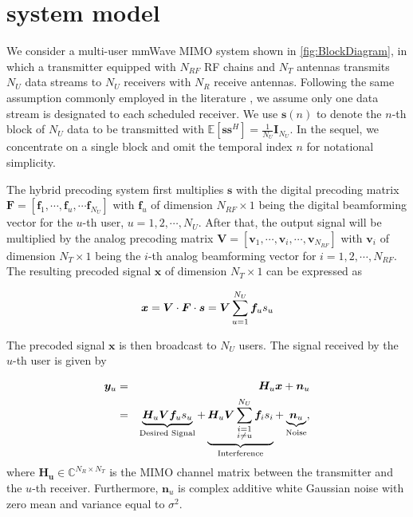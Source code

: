 \documentclass[conference]{IEEEtran}
\begin{document}
\section{system model}
We consider a multi-user mmWave MIMO system shown in \figurename{ \ref{fig:BlockDiagram}}, in which a transmitter equipped with $N_{RF}$ RF chains and $N_T$ antennas transmits $N_U$ data streams to $N_U$ receivers with $N_R$ receive antennas. Following the same assumption commonly employed in the literature \cite{alkhateeb2015limited}, we assume only one data stream is designated to each scheduled receiver. We use ${\bm s}(n)$ to denote the $n$-th block of $N_U$ data to be transmitted with $\mathbb{E}\left[\bm{ss}^H\right]=\frac{1}{N_U}\bm{I}_{N_U}$. In the sequel, we concentrate on a single block and omit the temporal index $n$ for notational simplicity.


The hybrid precoding system first multiplies ${\bm s}$ with the digital precoding matrix $\bm{F}=\left[{\bm f}_1,\cdots,{\bm f}_u,\cdots{\bm f}_{N_U}\right]$ with ${\bm f}_u$ of dimension $N_{RF}\times 1$ being the digital beamforming vector for the $u$-th user, $u=1,2,\cdots,N_U$. After that, the output signal will be multiplied by the analog precoding matrix $\bm{V}=\left[{\bm v}_1,\cdots,{\bm v}_i,\cdots,{\bm v}_{N_{RF}}\right]$ with ${\bm v}_i$ of dimension $N_T\times 1$ being the $i$-th analog beamforming vector for $i=1,2,\cdots,N_{RF}$. The resulting precoded signal $\bm x$ of dimension $N_T\times 1$  can be expressed as

\begin{equation}{\label{eq:transx1}}
{\bm x} = \bm{V}\cdot \bm{F}\cdot\bm{s}= \bm{V}\sum_{u=1}^{N_U}\bm{f}_us_u
\end{equation}

The precoded signal $\bm x$ is then broadcast to $N_U$ users. The signal received by the $u$-th user is given by

\begin{eqnarray}{\label{eq:transx2}}
{\bm y}_u &=& \bm{H}_u \bm{x} + \bm{n}_u \nonumber\\
&=&\underbrace{\bm{H}_u \bm{V}\bm{f}_us_u}_\text{Desired Signal}+\underbrace{\bm{H}_u \bm{V}\sum_{\substack{i=1 \\ i\neq u}}^{N_U}\bm{f}_is_i}_\text{Interference}+\underbrace{\bm{n}_u}_\text{Noise},
\end{eqnarray}
where $\bm{H_u}$$\in\mathbb{C}^{N_R\times N_T}$ is the MIMO channel matrix between the transmitter and the $u$-th receiver\cite{el2014spatially}. Furthermore, $\bm{n}_u$ is complex additive white Gaussian noise with zero mean and variance equal to $\sigma^2$.
\end{document}
